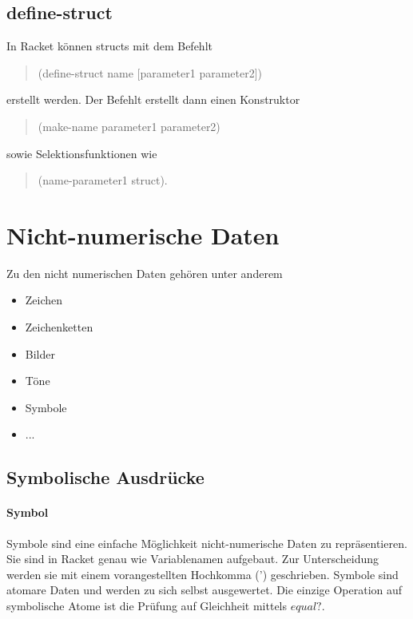 \documentclass[../main.tex]{subfiles}
\begin{document}
        \subsection{define-struct}
            In Racket können structs mit dem Befehlt
            \begin{quote}
                (define-struct name [parameter1 parameter2])
            \end{quote}
            erstellt werden. Der Befehlt erstellt dann einen Konstruktor
            \begin{quote}
                (make-name parameter1 parameter2)
            \end{quote}
            sowie Selektionsfunktionen wie
            \begin{quote}
                (name-parameter1 struct).
            \end{quote}
            
    \section{Nicht-numerische Daten}
        Zu den nicht numerischen Daten gehören unter anderem
        
        \begin{itemize}
            \item Zeichen
            \item Zeichenketten
            \item Bilder
            \item Töne
            \item Symbole
            \item ...
        \end{itemize}
        
        \subsection{Symbolische Ausdrücke}
            \paragraph{Symbol}
                Symbole sind eine einfache Möglichkeit nicht-numerische Daten zu repräsentieren. Sie sind in Racket genau wie Variablenamen aufgebaut. Zur Unterscheidung werden sie mit einem vorangestellten Hochkomma (') geschrieben. Symbole sind atomare Daten und werden zu sich selbst ausgewertet. Die einzige Operation auf symbolische Atome ist die Prüfung auf Gleichheit mittels $equal?$.
                
\end{document}
